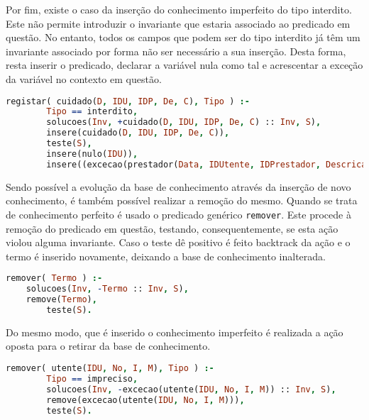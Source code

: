 \documentclass[a4paper]{article}
\begin{document}
Por fim, existe o caso da inserção do conhecimento imperfeito do tipo interdito. Este não permite introduzir o invariante que estaria associado ao predicado em questão. No entanto, todos os campos que podem ser do tipo interdito já têm um invariante associado por forma não ser necessário a sua inserção. Desta forma, resta inserir o predicado, declarar a variável nula como tal e acrescentar a exceção da variável no contexto em questão.

\begin{lstlisting}[language=Prolog, caption=Predicado que permite a inserção de conhecimento imperfeito do tipo interdito relativamente ao identificador de utente num cuidado. ]
registar( cuidado(D, IDU, IDP, De, C), Tipo ) :-
        Tipo == interdito,
        solucoes(Inv, +cuidado(D, IDU, IDP, De, C) :: Inv, S),
        insere(cuidado(D, IDU, IDP, De, C)),
        teste(S),
        insere(nulo(IDU)),
        insere((excecao(prestador(Data, IDUtente, IDPrestador, Descricao, Custo)) :- cuidado(Data, IDU, IDPrestador, Descricao, Custo))).
\end{lstlisting}

Sendo possível a evolução da base de conhecimento através da inserção de novo conhecimento, é também possível realizar a remoção do mesmo. Quando se trata de conhecimento perfeito é usado o predicado genérico \texttt{remover}. Este procede à remoção do predicado em questão, testando, consequentemente, se esta ação violou alguma invariante. Caso o teste dê positivo é feito backtrack da ação e o termo é inserido novamente, deixando a base de conhecimento inalterada.

\begin{lstlisting}[language=Prolog, caption=Predicado que permite a inevolução da base de conhecimento. ]
remover( Termo ) :- 
	solucoes(Inv, -Termo :: Inv, S),
 	remove(Termo),
        teste(S).
\end{lstlisting}

 Do mesmo modo, que é inserido o conhecimento imperfeito é realizada a ação oposta para o retirar da base de conhecimento.

\begin{lstlisting}[language=Prolog, caption=Predicado que permite a remoção de conhecimento imperfeito do tipo impreciso de um utente.]
remover( utente(IDU, No, I, M), Tipo ) :-
        Tipo == impreciso,
        solucoes(Inv, -excecao(utente(IDU, No, I, M)) :: Inv, S),
        remove(excecao(utente(IDU, No, I, M))),
        teste(S).
\end{lstlisting}
\end{document}
